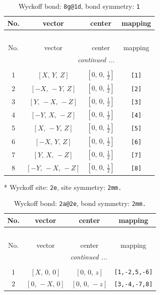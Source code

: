 \documentclass[fleqn,8pt]{jsarticle}
\begin{document}
\begin{longtable}{cccc}
\caption{Wyckoff bond: {\tt 8g@1d}, bond symmetry: {\tt 1}}
 \\
 \hline \hline
No. & vector & center & mapping \\ \hline \endfirsthead

\multicolumn{3}{l}{\tablename\ \thetable{}} \\
 \hline \hline
No. & vector & center & mapping \\ \hline \endhead

 \hline \hline
\multicolumn{3}{r}{\footnotesize\it continued ...} \\ \endfoot

 \hline \hline
\multicolumn{3}{r}{} \\ \endlastfoot

1 & $\left[ X,\, Y,\, Z \right]$ & $\left[ 0,\, 0,\, \frac{1}{2} \right]$ & {\tt [1]} \\ \hline
2 & $\left[ - X,\, - Y,\, Z \right]$ & $\left[ 0,\, 0,\, \frac{1}{2} \right]$ & {\tt [2]} \\ \hline
3 & $\left[ Y,\, - X,\, - Z \right]$ & $\left[ 0,\, 0,\, \frac{1}{2} \right]$ & {\tt [3]} \\ \hline
4 & $\left[ - Y,\, X,\, - Z \right]$ & $\left[ 0,\, 0,\, \frac{1}{2} \right]$ & {\tt [4]} \\ \hline
5 & $\left[ X,\, - Y,\, Z \right]$ & $\left[ 0,\, 0,\, \frac{1}{2} \right]$ & {\tt [5]} \\ \hline
6 & $\left[ - X,\, Y,\, Z \right]$ & $\left[ 0,\, 0,\, \frac{1}{2} \right]$ & {\tt [6]} \\ \hline
7 & $\left[ Y,\, X,\, - Z \right]$ & $\left[ 0,\, 0,\, \frac{1}{2} \right]$ & {\tt [7]} \\ \hline
8 & $\left[ - Y,\, - X,\, - Z \right]$ & $\left[ 0,\, 0,\, \frac{1}{2} \right]$ & {\tt [8]} \\
\end{longtable}
* Wyckoff site: {\tt 2e}, site symmetry: {\tt 2mm.}
\renewcommand{\arraystretch}{1.2}
\begin{longtable}{cccc}
\caption{Wyckoff bond: {\tt 2a@2e}, bond symmetry: {\tt 2mm.}}
 \\
 \hline \hline
No. & vector & center & mapping \\ \hline \endfirsthead

\multicolumn{3}{l}{\tablename\ \thetable{}} \\
 \hline \hline
No. & vector & center & mapping \\ \hline \endhead

 \hline \hline
\multicolumn{3}{r}{\footnotesize\it continued ...} \\ \endfoot

 \hline \hline
\multicolumn{3}{r}{} \\ \endlastfoot

1 & $\left[ X,\, 0,\, 0 \right]$ & $\left[ 0,\, 0,\, z \right]$ & {\tt [1,-2,5,-6]} \\ \hline
2 & $\left[ 0,\, - X,\, 0 \right]$ & $\left[ 0,\, 0,\, - z \right]$ & {\tt [3,-4,-7,8]} \\
\end{longtable}
\end{document}
